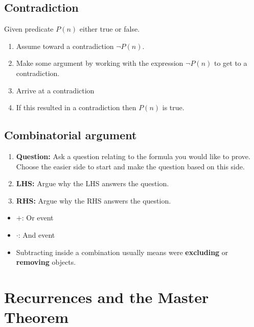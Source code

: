 \documentclass{article}
\begin{document}
\subsection{Contradiction}
\begin{process}
    Given predicate $P(n)$ either true or false.
    \begin{enumerate}
        \item Assume toward a contradiction $\neg P(n)$.
        \item Make some argument by working with the expression $\neg P(n)$ to get to a contradiction.
        \item Arrive at a contradiction
        \item If this resulted in a contradiction then $P(n)$ is true. 
    \end{enumerate}
\end{process}

\subsection{Combinatorial argument}
\begin{process}
    \begin{enumerate}
        \item \textbf{Question:} Ask a question relating to the formula you would like to prove. Choose the easier side to start and make the question based on this side.
        \item \textbf{LHS:} Argue why the LHS answers the question.
        \item \textbf{RHS:} Argue why the RHS answers the question.
    \end{enumerate}
\end{process}

\begin{intuition}
    \begin{itemize}
        \item $+$: Or event
        \item $\cdot$: And event
        \item Subtracting inside a combination usually means were \textbf{excluding} or \textbf{removing} objects.
    \end{itemize}
\end{intuition}
\newpage

\section{Recurrences and the Master Theorem}
\end{document}
